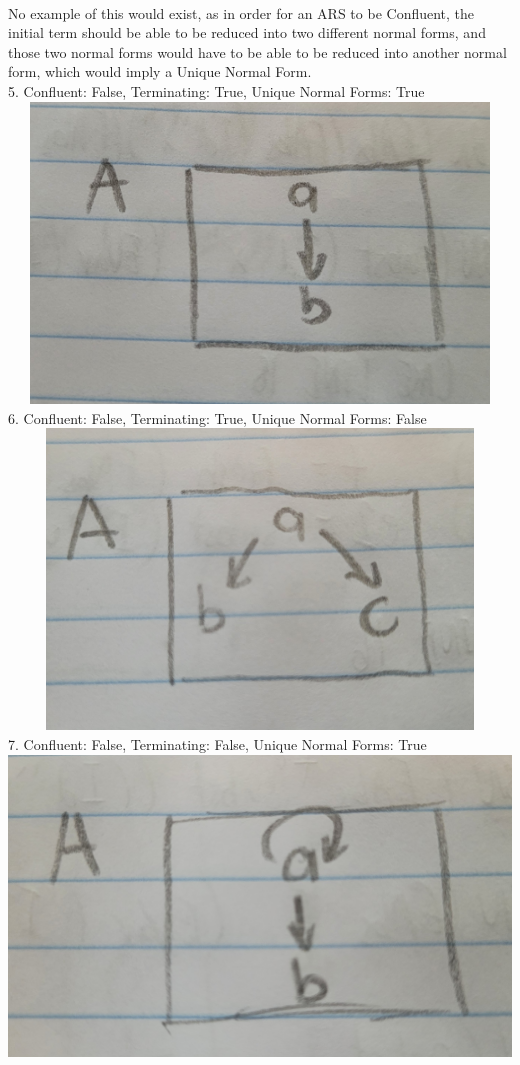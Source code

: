 \documentclass{article}
\theoremstyle{theorem}
\theoremstyle{definition}
\theoremstyle{remark}
\begin{document}
\\ No example of this would exist, as in order for an ARS to be Confluent, the initial term should be able to be reduced into two different normal forms, and those two normal forms would have to be able to be reduced into another normal form, which would imply a Unique Normal Form.
\\ 5. Confluent: False, Terminating: True, Unique Normal Forms: True
\\ \includegraphics[width=15cm, height=8cm]{Report Images/week7_10.jpg}
\\ 6. Confluent: False, Terminating: True, Unique Normal Forms: False
\\ \includegraphics[width=15cm, height=8cm]{Report Images/week7_11.jpg}
\\ 7. Confluent: False, Terminating: False, Unique Normal Forms: True
\\ \includegraphics[width=15cm, height=8cm]{Report Images/week7_12.jpg}
\end{document}
